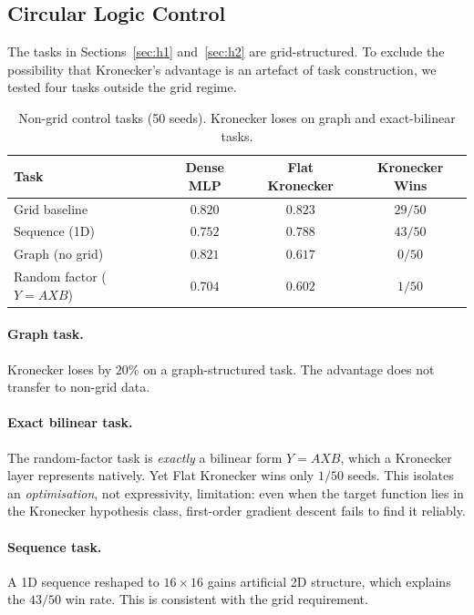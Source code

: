 \documentclass[11pt,a4paper]{article}
\begin{document}
\subsection{Circular Logic Control}
\label{sec:non-grid}

The tasks in Sections~\ref{sec:h1} and~\ref{sec:h2} are
grid-structured. To exclude the possibility that Kronecker's
advantage is an artefact of task construction, we tested four
tasks outside the grid regime.

\begin{table}[h]
\centering
\caption{Non-grid control tasks (50 seeds). Kronecker loses on
graph and exact-bilinear tasks.}
\label{tab:non-grid}
\small
\begin{tabular}{lccc}
\toprule
Task & Dense MLP & Flat Kronecker & Kronecker Wins \\
\midrule
Grid baseline             & $0.820$ & $0.823$ & $29/50$ \\
Sequence (1D)             & $0.752$ & $\mathbf{0.788}$ & $43/50$ \\
Graph (no grid)           & $\mathbf{0.821}$ & $0.617$ & $0/50$ \\
Random factor ($Y=AXB$)   & $\mathbf{0.704}$ & $0.602$ & $1/50$ \\
\bottomrule
\end{tabular}
\end{table}

\paragraph{Graph task.}
Kronecker loses by $20\%$ on a graph-structured task. The
advantage does not transfer to non-grid data.

\paragraph{Exact bilinear task.}
The random-factor task is \emph{exactly} a bilinear form
$Y = AXB$, which a Kronecker layer represents natively. Yet
Flat Kronecker wins only $1/50$ seeds. This isolates an
\emph{optimisation}, not expressivity, limitation: even when
the target function lies in the Kronecker hypothesis class,
first-order gradient descent fails to find it reliably.

\paragraph{Sequence task.}
A 1D sequence reshaped to $16 \times 16$ gains artificial 2D
structure, which explains the $43/50$ win rate. This is
consistent with the grid requirement.
\end{document}
